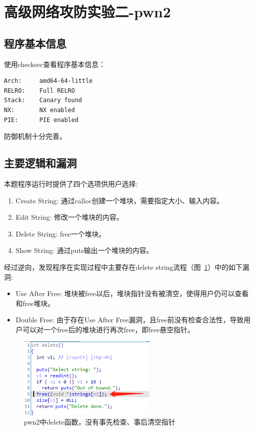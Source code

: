 \section{高级网络攻防实验二-pwn2}

\subsection{程序基本信息}
使用checksec查看程序基本信息：
\begin{lstlisting}
Arch:     amd64-64-little
RELRO:    Full RELRO
Stack:    Canary found
NX:       NX enabled
PIE:      PIE enabled
\end{lstlisting}
防御机制十分完善。

\subsection{主要逻辑和漏洞}
本题程序运行时提供了四个选项供用户选择:
\begin{enumerate}
    \item Create String: 通过calloc创建一个堆块，需要指定大小、输入内容。
    \item Edit String: 修改一个堆块的内容。
    \item Delete String: free一个堆块。
    \item Show String: 通过puts输出一个堆块的内容。
\end{enumerate}
经过逆向，发现程序在实现过程中主要存在delete string流程（图~\ref{fig:3}）中的如下漏洞:
\begin{itemize}
    \item Use After Free: 堆块被free以后，堆块指针没有被清空，使得用户仍可以查看和free堆块。
    \item Double Free: 由于存在Use After Free漏洞，且free前没有检查合法性，导致用户可以对一个free后的堆块进行再次free，即free悬空指针。
\end{itemize}
\begin{figure}[H]
    \centering
    \includegraphics[width=0.6\textwidth]{WP/pwn/pic/3.jpg}
    \caption{pwn2中delete函数，没有事先检查、事后清空指针}
    \label{fig:3}
\end{figure}

